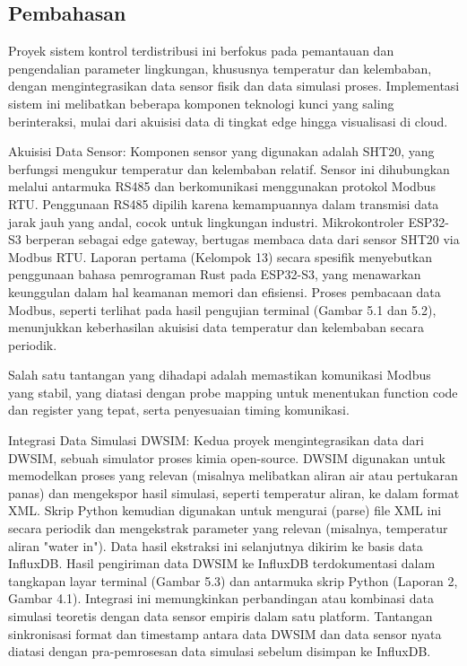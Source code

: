 \documentclass[a4paper, 12pt]{article}
\begin{document}
\subsection{Pembahasan}
Proyek sistem kontrol terdistribusi ini berfokus pada pemantauan dan pengendalian parameter lingkungan, khususnya temperatur dan kelembaban, dengan mengintegrasikan data sensor fisik dan data simulasi proses. Implementasi sistem ini melibatkan beberapa komponen teknologi kunci yang saling berinteraksi, mulai dari akuisisi data di tingkat edge hingga visualisasi di cloud.

Akuisisi Data Sensor: Komponen sensor yang digunakan adalah SHT20, yang berfungsi mengukur temperatur dan kelembaban relatif. Sensor ini dihubungkan melalui antarmuka RS485 dan berkomunikasi menggunakan protokol Modbus RTU. Penggunaan RS485 dipilih karena kemampuannya dalam transmisi data jarak jauh yang andal, cocok untuk lingkungan industri. Mikrokontroler ESP32-S3 berperan sebagai edge gateway, bertugas membaca data dari sensor SHT20  via Modbus RTU. Laporan pertama (Kelompok 13) secara spesifik menyebutkan penggunaan bahasa pemrograman Rust pada ESP32-S3, yang menawarkan keunggulan dalam hal keamanan memori dan efisiensi. Proses pembacaan data Modbus, seperti terlihat pada hasil pengujian terminal (Gambar 5.1 dan 5.2), menunjukkan keberhasilan akuisisi data temperatur dan kelembaban secara periodik. 

Salah satu tantangan yang dihadapi adalah memastikan komunikasi Modbus yang stabil, yang diatasi dengan probe mapping untuk menentukan function code dan register yang tepat, serta penyesuaian timing komunikasi.

Integrasi Data Simulasi DWSIM: Kedua proyek mengintegrasikan data dari DWSIM, sebuah simulator proses kimia open-source. DWSIM digunakan untuk memodelkan proses yang relevan (misalnya melibatkan aliran air atau pertukaran panas) dan mengekspor hasil simulasi, seperti temperatur aliran, ke dalam format XML. Skrip Python kemudian digunakan untuk mengurai (parse) file XML ini secara periodik dan mengekstrak parameter yang relevan (misalnya, temperatur aliran "water in"). Data hasil ekstraksi ini selanjutnya dikirim ke basis data InfluxDB. Hasil pengiriman data DWSIM ke InfluxDB terdokumentasi dalam tangkapan layar terminal (Gambar 5.3) dan antarmuka skrip Python (Laporan 2, Gambar 4.1). Integrasi ini memungkinkan perbandingan atau kombinasi data simulasi teoretis dengan data sensor empiris dalam satu platform. Tantangan sinkronisasi format dan timestamp antara data DWSIM dan data sensor nyata diatasi dengan pra-pemrosesan data simulasi sebelum disimpan ke InfluxDB.
\end{document}
